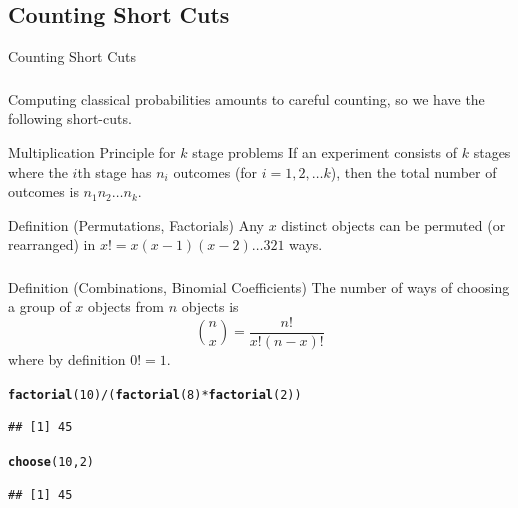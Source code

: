 \documentclass[t,xcolor=pdftex,dvipsnames,table]{beamer}
\makeatletter
\newcommand{\hlnum}[1]{\textcolor[rgb]{0.686,0.059,0.569}{#1}}%
\newcommand{\hlopt}[1]{\textcolor[rgb]{0,0,0}{#1}}%
\newcommand{\hlstd}[1]{\textcolor[rgb]{0.345,0.345,0.345}{#1}}%
\newcommand{\hlkwd}[1]{\textcolor[rgb]{0.737,0.353,0.396}{\textbf{#1}}}%
\newenvironment{kframe}{%
 \def\at@end@of@kframe{}%
 \ifinner\ifhmode%
  \def\at@end@of@kframe{\end{minipage}}%
  \begin{minipage}{\columnwidth}%
 \fi\fi%
 \def\FrameCommand##1{\hskip\@totalleftmargin \hskip-\fboxsep
 \colorbox{shadecolor}{##1}\hskip-\fboxsep
     \hskip-\linewidth \hskip-\@totalleftmargin \hskip\columnwidth}%
 \MakeFramed {\advance\hsize-\width
   \@totalleftmargin\z@ \linewidth\hsize
   \@setminipage}}%
 {\par\unskip\endMakeFramed%
 \at@end@of@kframe}
\newenvironment{knitrout}{}{} %
\makeatother
\begin{document}
\subsection[]{Counting Short Cuts}
\begin{frame}[label=Factorials]{Counting Short Cuts}
\frametitle{} 

Computing classical probabilities amounts to careful counting, so we have the following short-cuts.

\vspace{.5cm}
\begin{block}{Multiplication Principle for $k$ stage problems}
If an experiment consists of $k$ stages where the $i$th stage has $n_{i}$ outcomes (for $i=1,2,\ldots k$), then the total number of outcomes is $n_{1} n_{2} \ldots n_{k}$.
\end{block}

\vspace{.5cm}
\begin{block}{Definition (Permutations, Factorials)}
Any $x$ distinct objects can be permuted (or rearranged) in $x! = x(x-1)(x-2) \ldots 3 2 1$ ways.
\end{block}
\end{frame}

\begin{frame}[label=BinomialCoefficients,fragile]
\frametitle{} 

\begin{block}{Definition (Combinations, Binomial Coefficients)}
The number of ways of choosing a group of $x$ objects from $n$ objects is 
\[ {n \choose x}  = \frac{n!}{x! (n-x)!} \]
where by definition $0! = 1$.
\end{block}

\begin{knitrout}
\color{fgcolor}\begin{kframe}
\begin{alltt}
\hlkwd{factorial}\hlstd{(}\hlnum{10}\hlstd{)}\hlopt{/}\hlstd{(}\hlkwd{factorial}\hlstd{(}\hlnum{8}\hlstd{)}\hlopt{*}\hlkwd{factorial}\hlstd{(}\hlnum{2}\hlstd{))}
\end{alltt}
\begin{verbatim}
## [1] 45
\end{verbatim}
\begin{alltt}
\hlkwd{choose}\hlstd{(}\hlnum{10}\hlstd{,}\hlnum{2}\hlstd{)}
\end{alltt}
\begin{verbatim}
## [1] 45
\end{verbatim}
\end{kframe}
\end{knitrout}
\end{frame}
 
\end{document}
